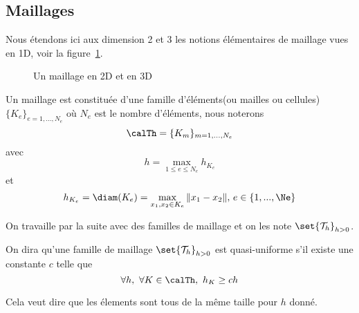 %
%

\subsection{Maillages}
\label{sec:maillages}

Nous étendons ici aux dimension 2 et 3 les notions élémentaires de maillage
vues en 1D, voir la figure~\ref{fig:2}.

\begin{figure}[htbp]
  \centering
  \caption{Un maillage en 2D et en 3D}
  \label{fig:2}
\end{figure}

\begin{definition}
  \label{def:31}
  Un maillage est constituée d'une famille d'éléments(ou mailles ou cellules)
  $\{K_e\}_{e=1,...,N_e}$ où $N_e$ est le nombre d'éléments, nous noterons
  \begin{equation}
    \label{eq:32}
    \calTh = \{K_m\}_{m=1,...,N_e}
  \end{equation}
  avec
  \begin{equation}
    \label{eq:33}
    h=\max_{1\le e\le N_e} h_{K_e}
  \end{equation}
  et
  \begin{equation}
    \label{eq:34}
    h_{K_e}     = \diam(K_e) = \max_{x_1,x_2 \in K_e} \|x_1-x_2\|,\, e \in \{1,...,\Ne\}
  \end{equation}

\end{definition}

On travaille par la suite avec des familles de maillage et on les note
$\set{\mathcal{T}_h}_{h > 0}$.

\begin{definition}
  On dira qu'une famille de maillage $\set{\mathcal{T}_h}_{h > 0}$ est
  \textrm{quasi-uniforme} s'il existe une constante $c$ telle que
  \begin{equation}
    \label{eq:35}
    \forall h,\ \forall K \in \calTh,\ h_K \geq c h
  \end{equation}
\end{definition}

\begin{remark}
  Cela veut dire que les élements sont tous de la même taille pour $h$
  donné.\label{rem:12}
\end{remark}

